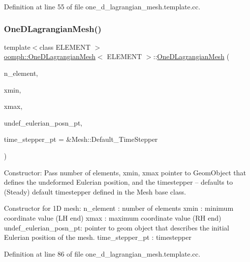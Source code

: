 Definition at line 55 of file one\+\_\+d\+\_\+lagrangian\+\_\+mesh.\+template.\+cc.

\mbox{\label{classoomph_1_1OneDLagrangianMesh_a20e1ab05b023f65bea5503938cd70385}} 
\subsubsection{\texorpdfstring{One\+D\+Lagrangian\+Mesh()}{OneDLagrangianMesh()}\hspace{0.1cm}{\footnotesize\ttfamily [2/2]}}
{\footnotesize\ttfamily template$<$class E\+L\+E\+M\+E\+NT $>$ \\
\hyperlink{classoomph_1_1OneDLagrangianMesh}{oomph\+::\+One\+D\+Lagrangian\+Mesh}$<$ E\+L\+E\+M\+E\+NT $>$\+::\hyperlink{classoomph_1_1OneDLagrangianMesh}{One\+D\+Lagrangian\+Mesh} (\begin{DoxyParamCaption}\item[{const unsigned \&}]{n\+\_\+element,  }\item[{const double \&}]{xmin,  }\item[{const double \&}]{xmax,  }\item[{Geom\+Object $\ast$}]{undef\+\_\+eulerian\+\_\+posn\+\_\+pt,  }\item[{Time\+Stepper $\ast$}]{time\+\_\+stepper\+\_\+pt = {\ttfamily \&Mesh\+:\+:Default\+\_\+TimeStepper} }\end{DoxyParamCaption})}



Constructor\+: Pass number of elements, xmin, xmax pointer to Geom\+Object that defines the undeformed Eulerian position, and the timestepper -- defaults to (Steady) default timestepper defined in the Mesh base class. 

Constructor for 1D mesh\+: n\+\_\+element \+: number of elements xmin \+: minimum coordinate value (LH end) xmax \+: maximum coordinate value (RH end) undef\+\_\+eulerian\+\_\+posn\+\_\+pt\+: pointer to geom object that describes the initial Eulerian position of the mesh. time\+\_\+stepper\+\_\+pt \+: timestepper 

Definition at line 86 of file one\+\_\+d\+\_\+lagrangian\+\_\+mesh.\+template.\+cc.




